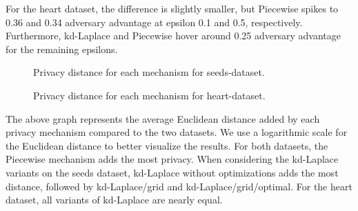 For the heart dataset, the difference is slightly smaller, but Piecewise spikes to 0.36 and 0.34 adversary advantage at epsilon 0.1 and 0.5, respectively. Furthermore, kd-Laplace and Piecewise hover around 0.25 adversary advantage for the remaining epsilons.
\newpage
\begin{figure}[H]
    \centering
    \begin{minipage}[c]{\textwidth}
        \caption{Privacy distance for each mechanism for seeds-dataset.}
        \label{fig:privacy_seeds-dataset_comparison_2d_privacy_distance_plot}
    \end{minipage}
    \begin{minipage}[c]{\textwidth}
        \caption{Privacy distance for each mechanism for heart-dataset.}
        \label{fig:privacy_heart-dataset_comparison_2d_privacy_distance_plot}
    \end{minipage}
\end{figure}
The above graph represents the average Euclidean distance added by each privacy mechanism compared to the two datasets. We use a logarithmic scale for the Euclidean distance to better visualize the results.
For both datasets, the Piecewise mechanism adds the most privacy. When considering the kd-Laplace variants on the seeds dataset, kd-Laplace without optimizations adds the most distance, followed by kd-Laplace/grid and kd-Laplace/grid/optimal. For the heart dataset, all variants of kd-Laplace are nearly equal.
\newpage

